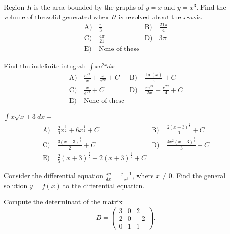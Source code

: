 \begin{problem}\label{PreCal-17}
Region $R$ is the area bounded by the graphs of $y=x$ and $y=x^{3}$. Find the volume of the solid generated when $R$ is revolved about the $x$-axis.
\begin{align*}
\text{A)}\ & \frac{\pi}{3} &
\text{B)}\ &  \frac{21 \pi}{4}\\
\text{C)}\ &  \frac{4 \pi}{21} &
\text{D)}\ & 3 \pi\\
\text{E)}\ &  \text{None of these}&
\end{align*}    
\end{problem}


\begin{problem}\label{PreCal-18}
Find the indefinite integral: $\int x e^{2 x} d x$
\begin{align*}
\text{A)}\ & \frac{e^{2 x}}{x}+\frac{x}{e^{2 x}}+C &
\text{B)}\ &  \frac{\ln (x)}{e}+C\\
\text{C)}\ &  \frac{x}{e^{2 x}}+C &
\text{D)}\ & \frac{x e^{2 x}}{2 x}-\frac{e^{2 x}}{4}+C\\
\text{E)}\ &  \text{None of these}&
\end{align*}    
\end{problem}


\begin{problem}\label{PreCal-19}
$\int x \sqrt{x+3} d x=$
\begin{align*}
\text{A)}\ & \frac{2}{3} x^{\frac{3}{2}}+6 x^{\frac{1}{2}}+C &
\text{B)}\ &  \frac{2(x+3)^{\frac{3}{2}}}{3}+C\\
\text{C)}\ &  \frac{3(x+3)^{\frac{3}{2}}}{2}+C &
\text{D)}\ & \frac{4 x^{2}(x+3)^{\frac{3}{2}}}{3}+C\\
\text{E)}\ & \frac{2}{5}(x+3)^{\frac{5}{2}}-2(x+3)^{\frac{3}{2}}+C &
\end{align*}    
\end{problem}






\begin{problem}
Consider the differential equation $\frac{dy}{dx} = \frac{y-1}{x^3}$, where $x\neq 0$. Find the general solution $y=f(x)$ to the differential equation.
\end{problem}






\begin{problem} Compute the determinant of the matrix
\[
B = \begin{pmatrix}
3 & 0 & 2 \\
2 & 0 & -2 \\
0 & 1 & 1
\end{pmatrix}.
\]
\end{problem}


